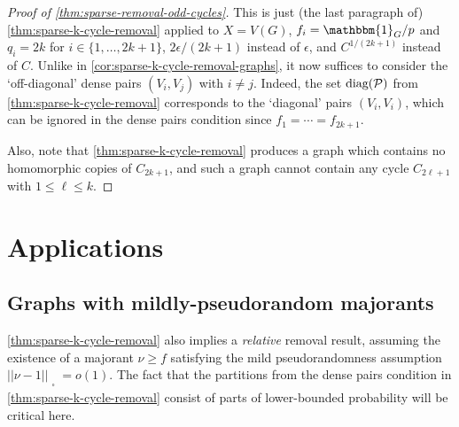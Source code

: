 \documentclass[reqno,11pt]{amsart}
\theoremstyle{definition}
\theoremstyle{remark}
\numberwithin{equation}{section}
\newcommand{\mP}{\mathcal{P}}
\newcommand{\one}{\mathbbm{1}}
\newcommand{\sq}{_{\substack{ \\ \square}}}
\newcommand{\diag}{\textnormal{diag}}
\begin{document}
\begin{proof}[Proof of \cref{thm:sparse-removal-odd-cycles}]
This is just (the last paragraph of) \cref{thm:sparse-k-cycle-removal} applied to $X = V(G)$, $f_i = \one_{G}/p$ and $q_i = 2k$ for $i \in \{1, \ldots, 2k+1\}$, $2\epsilon/(2k+1)$ instead of $\epsilon$, and $C^{1/(2k+1)}$ instead of $C$. Unlike in \cref{cor:sparse-k-cycle-removal-graphs}, it now suffices to consider the `off-diagonal' dense pairs $(V_i, V_j)$ with $i \neq j$. Indeed, the set $\diag(\mP)$ from \cref{thm:sparse-k-cycle-removal} corresponds to the `diagonal' pairs $(V_i, V_i)$, which can be ignored in the dense pairs condition since $f_1 = \cdots = f_{2k+1}$. 

Also, note that \cref{thm:sparse-k-cycle-removal} produces a graph which contains no homomorphic copies of $C_{2k+1}$, and such a graph cannot contain any cycle $C_{2\ell+1}$ with $1 \le \ell \le k$.
\end{proof}






\section{Applications} \label{sec:applications}



\subsection{Graphs with mildly-pseudorandom majorants}

\cref{thm:sparse-k-cycle-removal} also implies a \emph{relative} removal result, assuming the existence of a majorant $\nu \ge f$ satisfying the mild pseudorandomness assumption $||\nu - 1||\sq = o(1)$. The fact that the partitions from the dense pairs condition in \cref{thm:sparse-k-cycle-removal} consist of parts of lower-bounded probability will be critical here.
\end{document}
